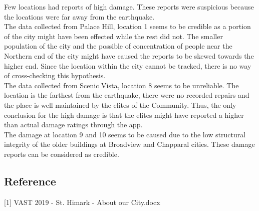 \documentclass[12pt]{extarticle}
\begin{document}
Few locations had reports of high damage. These reports were suspicious because the locations were far away from the earthquake. \\
The data collected from Palace Hill, location 1 seems to be credible as a portion of the city might have been effected while the rest did not. The smaller population of the city and the possible of concentration of people near the Northern end of the city might have caused the reports to be skewed towards the higher end. Since the location within the city cannot be tracked, there is no way of cross-checking this hypothesis. \\
The data collected from Scenic Vista, location 8 seems to be unreliable. The location is the farthest from the earthquake, there were no recorded repairs and the place is well maintained by the elites of the Community. Thus, the only conclusion for the high damage is that the elites might have reported a higher than actual damage ratings through the app. \\
The damage at location 9 and 10 seems to be caused due to the low structural integrity of the older buildings at Broadview and Chapparal cities. These damage reports can be considered as credible. 



\begin{centering}
	\section{Reference}
\end{centering}
[1] VAST 2019 - St. Himark -  About our City.docx
\end{document}
